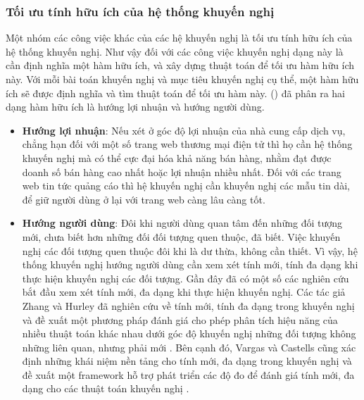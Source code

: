 \subsubsection{Tối ưu tính hữu ích của hệ thống khuyến nghị}
Một nhóm các công việc khác của các hệ khuyến nghị là tối ưu tính hữu ích của hệ thống khuyến nghị. Như vậy đối với các công việc khuyến nghị dạng này là cần định nghĩa một hàm hữu ích, và xây dựng thuật toán để tối ưu hàm hữu ích này. Với mỗi bài toán khuyến nghị và mục tiêu khuyến nghị cụ thể, một hàm hữu ích sẽ được định nghĩa và tìm thuật toán để tối ưu hàm này. (\citet{GunawardanaS09}) đã phân ra hai dạng hàm hữu ích là hướng lợi nhuận và hướng người dùng.
\begin{itemize}
\item \textbf{Hướng lợi nhuận}: Nếu xét ở góc độ lợi nhuận của nhà cung cấp dịch vụ, chẳng hạn đối với một số trang web thương mại điện tử thì họ cần hệ thống khuyến nghị mà có thể cực đại hóa khả năng bán hàng, nhằm đạt được doanh số bán hàng cao nhất hoặc lợi nhuận nhiều nhất. Đối với các trang web tin tức quảng cáo thì hệ khuyến nghị cần khuyến nghị các mẫu tin dài, để giữ người dùng ở lại với trang web càng lâu càng tốt.

\item \textbf{Hướng người dùng}: Đôi khi người dùng quan tâm đến những đối tượng mới, chưa biết hơn những đối đối tượng quen thuộc, đã biết. Việc khuyến nghị các đối tượng quen thuộc đôi khi là dư thừa, không cần thiết. Vì vậy, hệ thống khuyến nghị hướng người dùng cần xem xét tính mới, tính đa dạng khi thực hiện khuyến nghị các đối tượng. Gần đây đã có một số các nghiên cứu bắt đầu xem xét tính mới, đa dạng khi thực hiện khuyến nghị. Các tác giả Zhang và Hurley đã nghiên cứu về tính mới, tính đa dạng trong khuyến nghị và đề xuất một phương pháp đánh giá cho phép phân tích hiệu năng của nhiều thuật toán khác nhau dưới góc độ khuyến nghị những đối tượng không những liên quan, nhưng phải mới \cite{ZhangH09, Hurley:2011:NDT}. Bên cạnh đó, Vargas và Castells cũng xác định những khái niệm nền tảng cho tính mới, đa dạng trong khuyến nghị và đề xuất một framework hỗ trợ phát triển các độ đo để đánh giá tính mới, đa dạng cho các thuật toán khuyến nghị \cite{Vargas:2011:RRN}.
\end{itemize} 

